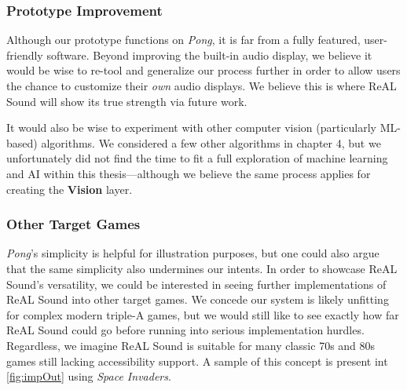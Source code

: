\documentclass{report}
\newcommand{\rs}{ReAL Sound\xspace}
\newcommand{\vision}{\textbf{Vision}\xspace}
\begin{document}
\subsubsection{Prototype Improvement}
Although our prototype functions on \emph{Pong}, it is far from a fully featured, user-friendly software. Beyond improving the built-in audio display, we believe it would be wise to re-tool and generalize our process further in order to allow users the chance to customize their \emph{own} audio displays. We believe this is where \rs will show its true strength via future work.

It would also be wise to experiment with other computer vision (particularly ML-based) algorithms. We considered a few other algorithms in chapter 4, but we unfortunately did not find the time to fit a full exploration of machine learning and AI within this thesis---although we believe the same process applies for creating the \vision layer.

\subsubsection{Other Target Games}

\begin{figure}
\end{figure}


\emph{Pong}'s simplicity is helpful for illustration purposes, but one could also argue that the same simplicity also undermines our intents. In order to showcase \rs's versatility, we could be interested in seeing further implementations of \rs into other target games. We concede our system is likely unfitting for complex modern triple-A games, but we would still like to see exactly how far \rs could go before running into serious implementation hurdles. Regardless, we imagine \rs is suitable for many classic 70s and 80s games still lacking accessibility support. A sample of this concept is present int \cref{fig:impOut} using \emph{Space Invaders}.
\end{document}
